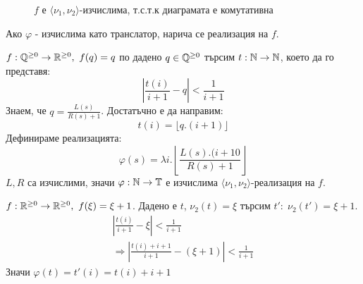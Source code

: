 \begin{figure}[H]
    \centering
    \caption{$f$ е $\langle \nu_1, \nu_2\rangle$-изчислима, т.с.т.к диаграмата е комутативна}
    \label{fig:eff-naming-realization}
\end{figure}
\begin{notation}
    Ако $\varphi$ - изчислима като транслатор, нарича се реализация на $f$.
\end{notation}
\begin{example}
    $f: {\mathbb{Q}}^{\geq 0} \to {\mathbb{R}}^{\geq 0},\ f(q) = q$ по дадено $q \in {\mathbb{Q}}^{\geq 0}$ търсим $t: {\mathbb{N}} \to {\mathbb{N}}$, което да го представя:
    \begin{equation}
        \left|\frac{t(i)}{i+1} - q\right| < \frac{1}{i+1}
    \end{equation}
    Знаем, че $q = \frac{L(s)}{R(s) + 1}$. Достатъчно е да направим:
    \begin{equation}
        t(i) = \lfloor q.(i+1)\rfloor
    \end{equation}
    Дефинираме реализацията:
    \begin{equation}
        \varphi(s) = \lambda i. \left\lfloor \frac{L(s).(i+10}{R(s) + 1} \right\rfloor
    \end{equation}
    $L, R$ са изчислими, значи $\varphi: {\mathbb{N}} \to \mathbb T$ е изчислима $\langle \nu_1, \nu_2 \rangle$-реализация на $f$.
\end{example}
\begin{example}
    $f: {\mathbb{R}}^{\geq 0} \to {\mathbb{R}}^{\geq 0},\ f(\xi) = \xi + 1$. Дадено е $t$, $\nu_2(t) = \xi$ търсим $t':\; \nu_2(t') = \xi + 1$. 
    \begin{equation}
        \begin{split}
            \left|\frac{t(i)}{i+1} - \xi\right| < \frac{1}{i+1}\\
            \Rightarrow \left|\frac{t(i) + i + 1}{i+1} - (\xi + 1)\right| < \frac{1}{i+1}
        \end{split}
    \end{equation}
    Значи $\varphi(t) = t'(i) = t(i) + i + 1$
\end{example}
